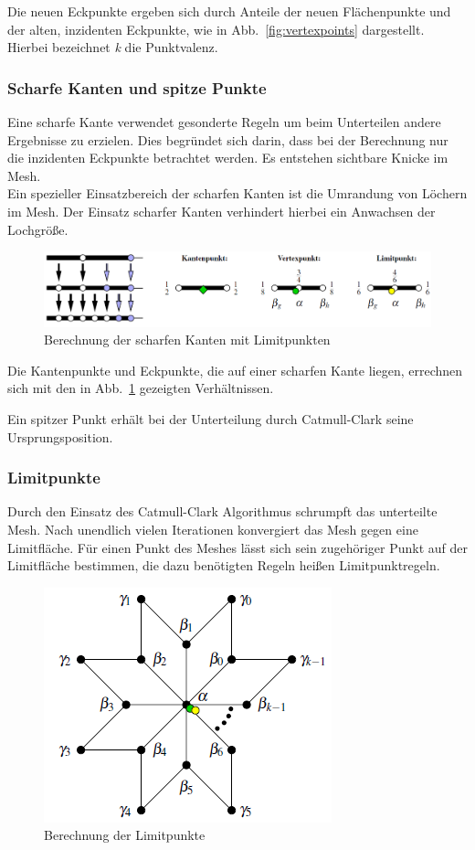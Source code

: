 Die neuen Eckpunkte ergeben sich durch Anteile der neuen Flächenpunkte und der alten, inzidenten Eckpunkte, wie in Abb.~\ref{fig:vertexpoints} dargestellt. Hierbei bezeichnet \emph{k} die Punktvalenz.

\subsubsection{Scharfe Kanten und spitze Punkte}
\label{sec:sharpEdge}
Eine scharfe Kante verwendet gesonderte Regeln um beim Unterteilen andere Ergebnisse zu erzielen. Dies begründet sich darin, dass bei der Berechnung nur die inzidenten Eckpunkte betrachtet werden. Es entstehen sichtbare Knicke im Mesh. \\

Ein spezieller Einsatzbereich der scharfen Kanten ist die Umrandung von Löchern im Mesh. Der Einsatz scharfer Kanten verhindert hierbei ein Anwachsen der Lochgröße.
\begin{figure}[tpb]
\centering
\includegraphics[width=\columnwidth]{content/pictures/sharpLimit.png}
\caption{Berechnung der scharfen Kanten mit Limitpunkten}
\label{fig:sharpLimit}
\end{figure}
Die Kantenpunkte und Eckpunkte, die auf einer scharfen Kante liegen, errechnen sich mit den in Abb.~\ref{fig:sharpLimit} gezeigten Verhältnissen. 

Ein spitzer Punkt erhält bei der Unterteilung durch Catmull-Clark seine Ursprungsposition.

\subsubsection{Limitpunkte}
Durch den Einsatz des Catmull-Clark Algorithmus schrumpft das unterteilte Mesh. Nach unendlich vielen Iterationen konvergiert das Mesh gegen eine Limitfläche. 
Für einen Punkt des Meshes lässt sich sein zugehöriger Punkt auf der Limitfläche bestimmen, die dazu benötigten Regeln heißen Limitpunktregeln.
\begin{figure}[htpb]
\centering
\includegraphics[scale=0.7]{content/pictures/limit.png}
\caption{Berechnung der Limitpunkte}
\label{fig:limit}
\end{figure}

